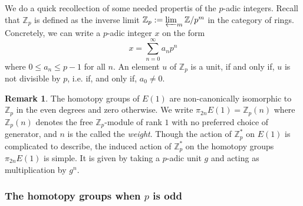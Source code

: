 \documentclass[a4paper]{article} %
\theoremstyle{definition}
\newtheorem{remark}[theorem]{Remark}
\newcommand{\Z}{\mathbb{Z}}
\begin{document}
We do a quick recollection of some needed propertis of the $p$-adic integers. Recall that $\Z_p$ is defined as the inverse limit $\Z_p := \varprojlim_m \Z/p^m$ in the category of rings. Concretely, we can write a $p$-adic integer $x$ on the form
\[
  x=\sum_{n = 0}^\infty a_n p^n
\]
where $ 0 \le a_n \le p-1$ for all $n$.
An element $u$ of $\Z_p$ is a unit, if and only if, $u$ is not divisible by $p$, i.e. if, and only if, $a_0 \neq 0$.

\begin{remark}
  The homotopy groups of $E(1)$ are non-canonically isomorphic to $\Z_p$ in the even degrees and zero otherwise. We write $\pi_{2n}E(1) = \Z_p(n)$ where $\Z_p(n)$ denotes the free $\Z_p$-module of rank $1$ with no preferred choice of generator, and $n$ is the called the \textit{weight}. Though the action of $\Z_p^*$ on $E(1)$ is complicated to describe, the induced action of $\Z_p^*$ on the homotopy groups $\pi_{2n}E(1)$ is simple. It is given by taking a $p$-adic unit $g$ and acting as multiplication by $g^n$.
\end{remark}

\subsubsection{The homotopy groups when $p$ is odd}
\end{document}
